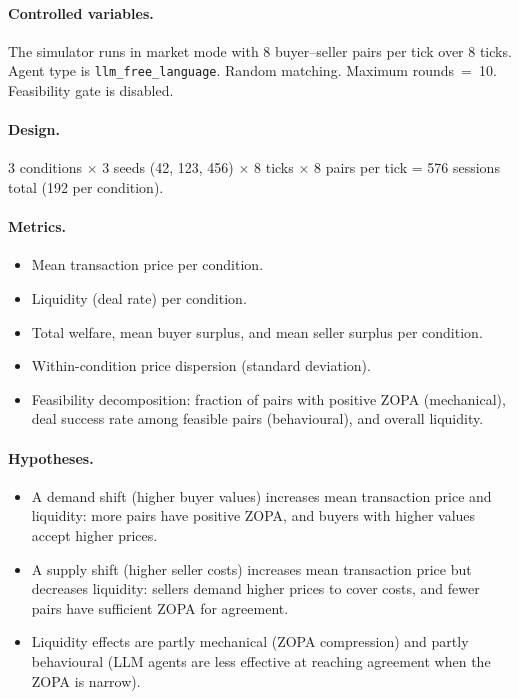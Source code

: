 \paragraph{Controlled variables.}
The simulator runs in market mode with 8 buyer--seller pairs per tick over 8 ticks.  Agent type is \texttt{llm\_free\_language}.  Random matching.  Maximum rounds~=~10.  Feasibility gate is disabled.

\paragraph{Design.}
3 conditions $\times$ 3 seeds (42, 123, 456) $\times$ 8 ticks $\times$ 8 pairs per tick = 576 sessions total (192 per condition).

\paragraph{Metrics.}
\begin{itemize}
    \item Mean transaction price per condition.
    \item Liquidity (deal rate) per condition.
    \item Total welfare, mean buyer surplus, and mean seller surplus per condition.
    \item Within-condition price dispersion (standard deviation).
    \item Feasibility decomposition: fraction of pairs with positive ZOPA (mechanical), deal success rate among feasible pairs (behavioural), and overall liquidity.
\end{itemize}

\paragraph{Hypotheses.}
\begin{itemize}
    \item[\textbf{H-I1.}] A demand shift (higher buyer values) increases mean transaction price and liquidity: more pairs have positive ZOPA, and buyers with higher values accept higher prices.
    \item[\textbf{H-I2.}] A supply shift (higher seller costs) increases mean transaction price but decreases liquidity: sellers demand higher prices to cover costs, and fewer pairs have sufficient ZOPA for agreement.
    \item[\textbf{H-I3.}] Liquidity effects are partly mechanical (ZOPA compression) and partly behavioural (LLM agents are less effective at reaching agreement when the ZOPA is narrow).
\end{itemize}

